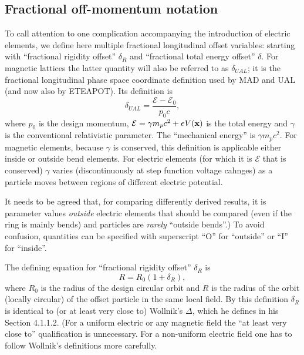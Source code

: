 \documentclass[12]{article}
\begin{document}
\subsection{Fractional off-momentum notation\label{sec:FracLongitOffset}}
To call attention to one complication accompanying the introduction of
electric elements, we define here multiple fractional longitudinal offset 
variables: starting with ``fractional rigidity offset'' $\delta_R$ 
and ``fractional total energy offset'' $\delta$.  For magnetic lattices 
the latter quantity will also be referred to as $\delta_{UAL}$; it is the 
fractional longitudinal phase space coordinate definition used by MAD and UAL 
(and now also by ETEAPOT). Its definition is
%
\begin{equation}
\delta_{UAL} = \frac{\mathcal{E}-\mathcal{E}_0}{p_0c},
\label{eq:Notation.1}
\end{equation}
%
where $p_0$ is the design momentum, 
$\mathcal{E}=\gamma m_pc^2 + eV({\bf x})$ is the total energy
and $\gamma$ is the conventional relativistic parameter. 
The ``mechanical energy'' is $\gamma m_pc^2$. For magnetic elements, because
$\gamma$ is conserved, this definition is applicable either 
inside or outside bend elements. For electric elements (for
which it is $\mathcal{E}$ that is conserved)
$\gamma$ varies (discontinuously at step function voltage cahnges)
as a particle moves between regions of different electric potential.

It needs to be agreed that, for comparing differently derived 
results, it is parameter values \emph{outside} electric
elements that should be compared (even if the ring is mainly bends)
and particles are \emph{rarely}
``outside bends''.) To avoid confusion, quantities can
be specified with superscript ``O'' for ``outside''
or ``I'' for ``inside''.

The defining equation for ``fractional rigidity offset'' $\delta_R$ is
%
\begin{equation}
R = R_0(1+\delta_R),
\label{eq:Notation.2}
\end{equation}
%
where $R_0$ is the radius of the design circular orbit
and $R$ is the radius of the orbit (locally circular) of
the offset particle in the same local field. By this definition
$\delta_R$ is identical to (or at least very close to) 
Wollnik's\cite{Wollnik} $\Delta$, which he defines in his 
Section 4.1.1.2. (For a uniform electric or any magnetic field 
the ``at least very close to''
qualification is unnecessary. For a non-uniform electric field
one has to follow Wollnik's definitions more carefully.
\end{document}
